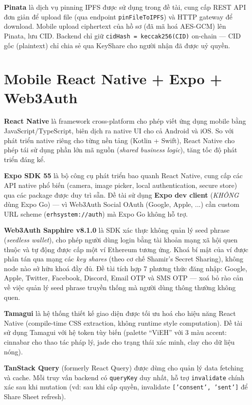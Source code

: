\documentclass[../DoAn]{subfiles}
\begin{document}
\textbf{Pinata} \cite{pinata} là dịch vụ pinning IPFS được sử dụng trong đề tài, cung cấp REST API đơn giản để upload file (qua endpoint \texttt{pinFileToIPFS}) và HTTP gateway để download. Mobile upload ciphertext của hồ sơ (đã mã hoá AES-GCM) lên Pinata, lưu CID. Backend chỉ giữ \texttt{cidHash = keccak256(CID)} on-chain --- CID gốc (plaintext) chỉ chia sẻ qua KeyShare cho người nhận đã được uỷ quyền.

\section{Mobile React Native + Expo + Web3Auth}

\textbf{React Native} \cite{reactnative} là framework cross-platform cho phép viết ứng dụng mobile bằng JavaScript/TypeScript, biên dịch ra native UI cho cả Android và iOS. So với phát triển native riêng cho từng nền tảng (Kotlin + Swift), React Native cho phép tái sử dụng phần lớn mã nguồn (\textit{shared business logic}), tăng tốc độ phát triển đáng kể.

\textbf{Expo SDK 55} \cite{expo} là bộ công cụ phát triển bao quanh React Native, cung cấp các API native phổ biến (camera, image picker, local authentication, secure store) qua các package được duy trì sẵn. Đề tài sử dụng \textbf{Expo dev client} (\textit{KHÔNG} dùng Expo Go) --- vì Web3Auth Social OAuth (Google, Apple, ...) cần custom URL scheme (\texttt{erhsystem://auth}) mà Expo Go không hỗ trợ.

\textbf{Web3Auth Sapphire v8.1.0} \cite{web3auth} là SDK xác thực không quản lý seed phrase (\textit{seedless wallet}), cho phép người dùng login bằng tài khoản mạng xã hội quen thuộc và tự động được cấp một ví Ethereum tương ứng. Khoá bí mật của ví được phân tán qua mạng các \textit{key shares} (theo cơ chế Shamir's Secret Sharing), không node nào sở hữu khoá đầy đủ. Đề tài tích hợp 7 phương thức đăng nhập: Google, Apple, Twitter, Facebook, Discord, Email OTP và SMS OTP --- xoá bỏ rào cản về việc quản lý seed phrase truyền thống mà người dùng thông thường không quen.

\textbf{Tamagui} \cite{tamagui} là hệ thống thiết kế giao diện được tối ưu hoá cho hiệu năng React Native (compile-time CSS extraction, không runtime style computation). Đề tài sử dụng Tamagui với hệ token tùy biến (palette ``ViEH'' với 3 màu accent: cinnabar cho thao tác pháp lý, jade cho trạng thái xác minh, clay cho dữ liệu nóng).

\textbf{TanStack Query} (formerly React Query) được dùng cho quản lý data fetching và cache. Mỗi truy vấn backend có \texttt{queryKey} duy nhất, hỗ trợ \texttt{invalidate} chính xác sau khi mutation (vd: sau khi cấp quyền, invalidate \texttt{['consent', 'sent']} để Share Sheet refresh).
\end{document}
